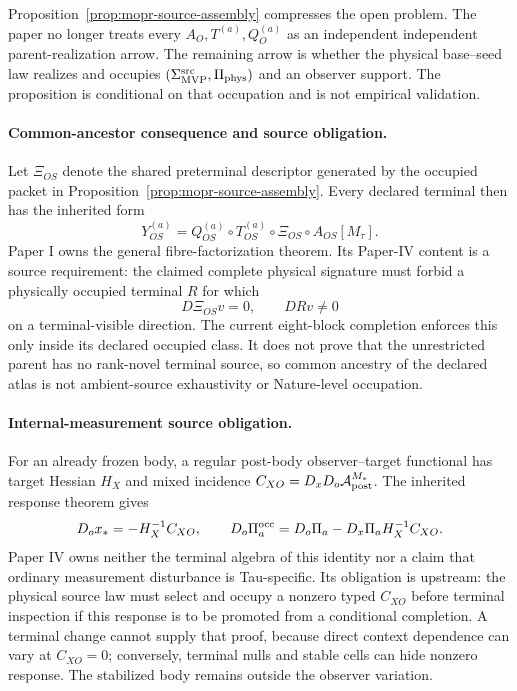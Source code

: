 \documentclass[11pt]{article}
\begin{document}
Proposition~\ref{prop:mopr-source-assembly} compresses the open problem. The
paper no longer treats every $A_O,T^{(a)},Q_O^{(a)}$ as an independent
independent parent-realization arrow. The remaining arrow is whether the
physical base--seed law realizes and occupies
$(\Sigma_{\rm MVP}^{\rm src},\Pi_{\rm phys})$ and an observer support.
The proposition is conditional on that occupation and is not empirical
validation.

\paragraph{Common-ancestor consequence and source obligation.}
Let \(\Xi_{OS}\) denote the shared preterminal descriptor generated by the
occupied packet in Proposition~\ref{prop:mopr-source-assembly}.  Every declared
terminal then has the inherited form
\begin{equation}
 Y_{OS}^{(a)}
 =
 Q_{OS}^{(a)}\circ T_{OS}^{(a)}
 \circ\Xi_{OS}\circ A_{OS}[M_\tau].
 \label{eq:paperiv-unified-terminal-atlas}
\end{equation}
Paper I owns the general fibre-factorization theorem.  Its Paper-IV content is
a source requirement: the claimed complete physical signature must forbid a
physically occupied terminal \(R\) for which
\begin{equation}
 D\Xi_{OS}v=0,\qquad DRv\neq0
 \label{eq:paperiv-ancestor-bypass}
\end{equation}
on a terminal-visible direction.  The current eight-block completion enforces
this only inside its declared occupied class.  It does not prove that the
unrestricted parent has no rank-novel terminal source, so common ancestry of
the declared atlas is not ambient-source exhaustivity or Nature-level
occupation.

\paragraph{Internal-measurement source obligation.}
For an already frozen body, a regular post-body observer--target functional
has target Hessian $H_X$ and mixed incidence
$C_{XO}=D_xD_o\mathcal A_{\rm post}^{M_*}$. The inherited response theorem
gives
\begin{equation}
 D_ox_*=-H_X^{-1}C_{XO},
 \qquad
 D_o\Pi_a^{\rm occ}=D_o\Pi_a-D_x\Pi_aH_X^{-1}C_{XO}.
 \label{eq:paperiv-gimb-source-obligation}
\end{equation}
Paper IV owns neither the terminal algebra of this identity nor a claim that
ordinary measurement disturbance is Tau-specific. Its obligation is
upstream: the physical source law must select and occupy a nonzero typed
$C_{XO}$ before terminal inspection if this response is to be promoted from a
conditional completion. A terminal change cannot supply that proof, because
direct context dependence can vary at $C_{XO}=0$; conversely, terminal nulls
and stable cells can hide nonzero response. The stabilized body remains
outside the observer variation.
\end{document}
